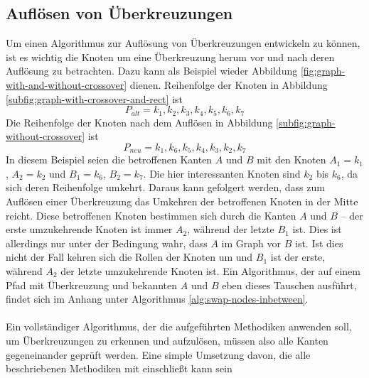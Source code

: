 \subsection{Auflösen von Überkreuzungen}

Um einen Algorithmus zur Auflösung von Überkreuzungen entwickeln zu können, ist es wichtig die Knoten um eine Überkreuzung herum vor und nach deren Auflösung zu betrachten.
Dazu kann als Beispiel wieder Abbildung \vref{fig:graph-with-and-without-crossover} dienen.
Reihenfolge der Knoten in Abbildung \vref{subfig:graph-with-crossover-and-rect} ist $$P_{alt} = k_1, k_2, k_3, k_4, k_5, k_6, k_7$$
Die Reihenfolge der Knoten nach dem Auflösen in Abbildung \vref{subfig:graph-without-crossover} ist $$P_{neu} = k_1, k_6, k_5, k_4, k_3, k_2, k_7$$
In diesem Beispiel seien die betroffenen Kanten $A$ und $B$ mit den Knoten $A_1 = k_1$, $A_2 = k_2$ und $B_1 = k_6$, $B_2 = k_7$.
Die hier interessanten Knoten sind $k_2$ bis $k_6$, da sich deren Reihenfolge umkehrt.
Daraus kann gefolgert werden, dass zum Auflösen einer Überkreuzung das Umkehren der betroffenen Knoten in der Mitte reicht.
Diese betroffenen Knoten bestimmen sich durch die Kanten $A$ und $B$ -- der erste umzukehrende Knoten ist immer $A_2$, während der letzte $B_1$ ist.
Dies ist allerdings nur unter der Bedingung wahr, dass $A$ im Graph vor $B$ ist.
Ist dies nicht der Fall kehren sich die Rollen der Knoten um und $B_1$ ist der erste, während $A_2$ der letzte umzukehrende Knoten ist.
Ein Algorithmus, der auf einem Pfad mit Überkreuzung und bekannten $A$ und $B$ eben dieses Tauschen ausführt, findet sich im Anhang unter Algorithmus \vref{alg:swap-nodes-inbetween}.
\\\\
Ein vollständiger Algorithmus, der die aufgeführten Methodiken anwenden soll, um Überkreuzungen zu erkennen und aufzulösen, müssen also alle Kanten gegeneinander geprüft werden.
Eine simple Umsetzung davon, die alle beschriebenen Methodiken mit einschließt kann sein
